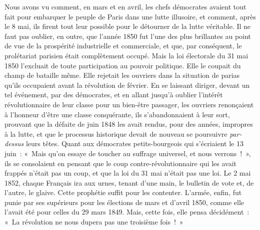 \documentclass[french,twoside]{book} %
\begin{document}
Nous avons vu comment, en mars et en avril, les chefs démocrates avaient tout fait pour embarquer le peuple de Paris dans une lutte illusoire, et comment, après le 8 mai, ils firent tout leur possible pour le détourner de la lutte véritable. Il ne faut pas oublier, en outre, que l’année 1850 fut l’une des plus brillantes au point de vue de la prospérité industrielle et commerciale, et que, par conséquent, le prolétariat parisien était complètement occupé. Mais la loi électorale du 31 mai 1850 l’excluait de toute participation au pouvoir politique. Elle le coupait du champ de bataille même. Elle rejetait les ouvriers dans la situation de parias qu’ils occupaient avant la révolution de février. En se laissant diriger, devant un tel événement, par des démocrates, et en allant jusqu’à oublier l’intérêt révolutionnaire de leur classe pour un bien-être passager, les ouvriers renonçaient à l’honneur d’être une classe conquérante, ils s’abandonnaient à leur sort, prouvant que la défaite de juin 1848 les avait rendus, pour des années, impropres à la lutte, et que le processus historique devait de nouveau se poursuivre \emph{par-dessus} leurs têtes. Quant aux démocrates petits-bourgeois qui s’écriaient le 13 juin : « Mais qu’on essaye de toucher au suffrage universel, et nous verrons ! », ils se consolaient en pensant que le coup contre-révolutionnaire qui les avait frappés n’était pas un coup, et que la loi du 31 mai n’était pas une loi. Le 2 mai 1852, chaque Français ira aux urnes, tenant d’une main, le bulletin de vote et, de l’autre, le glaive. Cette prophétie suffit pour les contenter. L’armée, enfin, fut punie par ses supérieurs pour les élections de mars et d’avril 1850, comme elle l’avait été pour celles du 29 mars 1849. Mais, cette fois, elle pensa décidément : « La révolution ne nous dupera pas une troisième fois ! »\par
\end{document}
